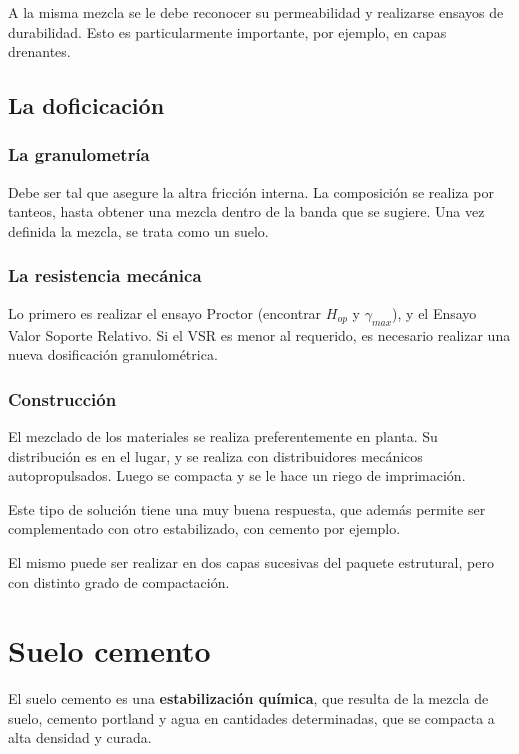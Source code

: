 \documentclass[../main.tex]{subfiles}
\begin{document}
A la misma mezcla se le debe reconocer su permeabilidad y realizarse ensayos de
durabilidad. Esto es particularmente importante, por ejemplo, en capas drenantes.

\subsection{La doficicación}

\subsubsection{La granulometría}

Debe ser tal que asegure la altra fricción interna. La composición se realiza
por tanteos, hasta obtener una mezcla dentro de la banda que se sugiere.
Una vez definida la mezcla, se trata como un suelo.

\subsubsection{La resistencia mecánica}

Lo primero es realizar el ensayo Proctor (encontrar $H_{op}$ y $\gamma_{max}$),
y el Ensayo Valor Soporte Relativo. Si el VSR es menor al requerido, es necesario
realizar una nueva dosificación granulométrica.

\subsubsection{Construcción}

El mezclado de los materiales se realiza preferentemente en planta. Su distribución
es en el lugar, y se realiza con distribuidores mecánicos autopropulsados. Luego
se compacta y se le hace un riego de imprimación.

Este tipo de solución tiene una muy buena respuesta, que además permite ser 
complementado con otro estabilizado, con cemento por ejemplo. 

El mismo puede ser realizar en dos capas sucesivas del paquete estrutural, pero
con distinto grado de compactación.

\section{Suelo cemento}

El suelo cemento es una \textbf{estabilización química}, que resulta de la mezcla
de suelo, cemento portland y agua en cantidades determinadas, que se compacta
a alta densidad y curada.
\end{document}
